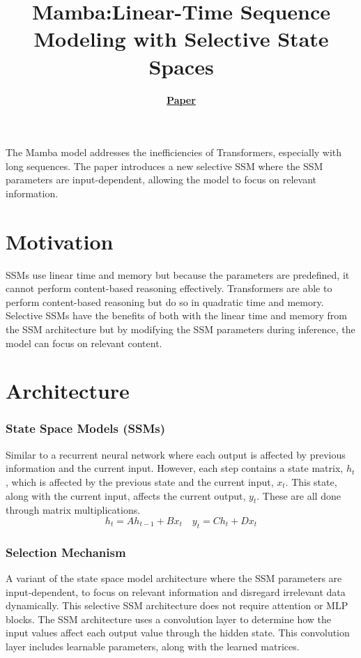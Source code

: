 \documentclass{article}
\title{Mamba:\@ Linear-Time Sequence Modeling with Selective State Spaces}
\author{\textbf{\href{https://arxiv.org/pdf/2312.00752}{Paper}}}
\date{}
\begin{document}
\maketitle

The Mamba model addresses the inefficiencies of Transformers, especially with long sequences. The
paper introduces a new selective SSM where the SSM parameters are input-dependent, allowing the
model to focus on relevant information.

\section*{Motivation}

SSMs use linear time and memory but because the parameters are predefined, it cannot perform
content-based reasoning effectively. Transformers are able to perform content-based reasoning but
do so in quadratic time and memory. Selective SSMs have the benefits of both with the linear time
and memory from the SSM architecture but by modifying the SSM parameters during inference, the
model can focus on relevant content.

\section*{Architecture}

\subsubsection*{State Space Models (SSMs)}

Similar to a recurrent neural network where each output is affected by previous information and the
current input. However, each step contains a state matrix, $h_t$, which is affected by the previous
state and the current input, $x_t$. This state, along with the current input, affects the current
output, $y_t$. These are all done through matrix multiplications.
\[h_t = Ah_{t-1}+Bx_t\quad y_t = Ch_t + Dx_t\]

\subsubsection*{Selection Mechanism}

A variant of the state space model architecture where the SSM parameters are input-dependent, to
focus on relevant information and disregard irrelevant data dynamically. This selective SSM
architecture does not require attention or MLP blocks. The SSM architecture uses a convolution
layer to determine how the input values affect each output value through the hidden state. This
convolution layer includes learnable parameters, along with the learned matrices.
\end{document}
